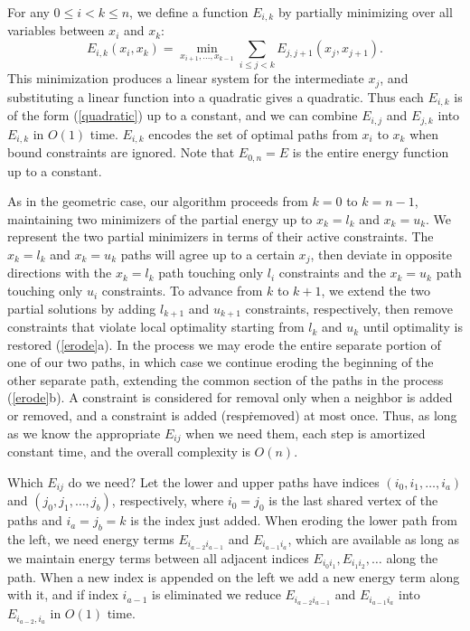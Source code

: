 \documentclass[11pt]{article}
\begin{document}
For any $0 \le i < k \le n$, we define a function $E_{i,k}$ by partially minimizing over all variables between $x_i$ and $x_k$:
$$E_{i,k}(x_i,x_k) = \min_{x_{i+1}, \ldots, x_{k-1}} \sum_{i \le j < k} E_{j,j+1}(x_j,x_{j+1}).$$
This minimization produces a linear system for the intermediate $x_j$, and substituting a linear function into a quadratic gives a quadratic.  Thus each $E_{i,k}$ is of the form (\autoref{quadratic}) up to a constant,
and we can combine $E_{i,j}$ and $E_{j,k}$ into $E_{i,k}$ in $O(1)$ time.  $E_{i,k}$ encodes the set of optimal paths from $x_i$ to $x_k$ when bound constraints are ignored.  Note that $E_{0,n} = E$
is the entire energy function up to a constant.

As in the geometric case, our algorithm proceeds from $k = 0$ to $k = n-1$, maintaining two minimizers of the partial energy up to $x_k = l_k$ and $x_k = u_k$.  We represent the two partial minimizers in terms of
their active constraints.  The $x_k = l_k$ and $x_k = u_k$ paths will agree up to a certain $x_j$, then deviate
in opposite directions with the $x_k = l_k$ path touching only $l_i$ constraints and the $x_k = u_k$ path touching only $u_i$ constraints.  To advance from $k$ to $k+1$, we extend the two partial solutions by adding
$l_{k+1}$ and $u_{k+1}$ constraints, respectively, then remove constraints that violate local optimality starting from $l_k$ and $u_k$ until optimality is restored (\autoref{erode}a).  In the process we may erode the entire separate
portion of one of our two paths, in which case we continue eroding the beginning of the other separate path, extending the common section of the paths in the process (\autoref{erode}b).
A constraint is considered for removal only when a neighbor is added or removed, and a constraint is added (resp\. removed) at most once.  Thus, as long as we know the appropriate $E_{ij}$ when we need them, each step
is amortized constant time, and the overall complexity is $O(n)$.

Which $E_{ij}$ do we need?  Let the lower and upper paths have indices $(i_0, i_1, \ldots, i_a)$ and $(j_0, j_1, \ldots, j_b)$, respectively, where $i_0 = j_0$ is the last shared vertex of the paths
and $i_a = j_b = k$ is the index just added.  When eroding the lower path from the left, we need energy terms $E_{i_{a-2}i_{a-1}}$ and $E_{i_{a-1}i_{a}}$, which are available as long as we maintain
energy terms between all adjacent indices $E_{i_0i_1}, E_{i_1i_2}, \ldots$ along the path.  When a new index is appended on the left we add a new energy term along with it, and if index $i_{a-1}$ is
eliminated we reduce $E_{i_{a-2}i_{a-1}}$ and $E_{i_{a-1}i_{a}}$ into $E_{i_{a-2},i_a}$ in $O(1)$ time.
\end{document}
